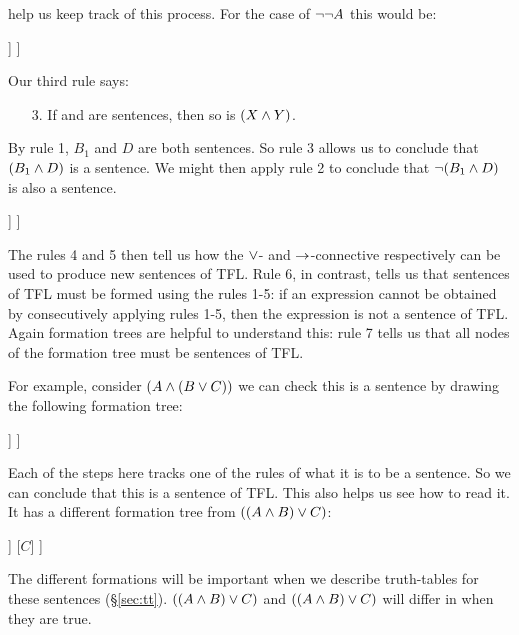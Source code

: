  help us keep track of this process. For the case of $\neg\neg A$ this would be:
\begin{center}
\begin{forest}
	[$\mainconnective{\enot}\, \enot A$
		[$\mainconnective{\enot}A$
			[$A$]
		]
	]
\end{forest}
\end{center}

Our third rule says:
\begin{enumerate}
\item[3.] If \metaX and \metaY are sentences, then so is $(X\mathbin{\wedge}Y)$.
\end{enumerate}
By rule 1, $B_1$ and $D$ are both sentences. So rule 3 allows us to conclude that $(B_1\mathbin{\wedge} D)$ is a sentence. We might then apply rule 2 to conclude that $\neg(B_1\mathbin{\wedge} D)$ is also a sentence.
\begin{center}
\begin{forest}
	[$\mainconnective{\enot}\,  (B_1 \eand D)$
		[$(B_1\mainconnective{\eand} D)$
			[$B_1$]
			[$D$]
		]
	]
\end{forest}
\end{center}

The rules 4 and 5 then tell us how the $\vee$- and $\rightarrow$-connective respectively can be used to produce new sentences of TFL. Rule 6, in contrast, tells us that sentences of TFL must be formed using the rules 1-5: if an expression cannot be obtained by consecutively applying rules 1-5, then the expression is not a sentence of TFL. Again formation trees are helpful to understand this: rule 7 tells us that all nodes of the formation tree must be sentences of TFL.

For example, consider $(A \mathbin{\wedge} (B \vee C))$ we can check this is a sentence by drawing the following formation tree:
\label{S:formationtree}
\begin{center}
\begin{forest}
	[$(A\mainconnective{\eand} (B\eor C))$
		[$A$]
		[$(B\mainconnective{\eor} C)$
			[$B$]
			[$C$]
		]
	]
\end{forest}
\end{center}
Each of the steps here tracks one of the rules of what it is to be a sentence. So we can conclude that this is a sentence of TFL. This also helps us see how to read it.
It has a different formation tree from $((A\mathbin{\wedge} B)\vee C)$:
\begin{center}
\begin{forest}
	[$((A{\eand} B)\mainconnective{\eor} C))$
		[$(A\mainconnective{\eand} B)$
			[$A$]
			[$B$]
		]
		[$C$]
	]
\end{forest}
\end{center}
The different formations will be important when we describe truth-tables for these sentences (\S\ref{sec:tt}). $((A\mathbin{\wedge} B)\vee C)$ and $((A\mathbin{\wedge} B)\vee C)$ will differ in when they are true.


